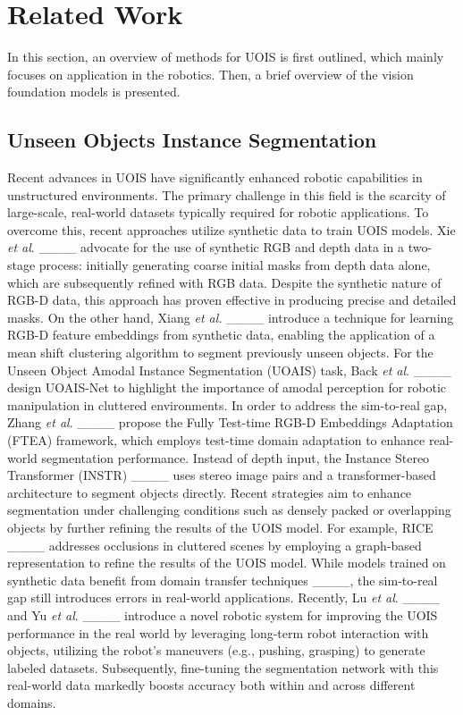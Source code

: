 \section{Related Work}
\label{section2}
In this section, an overview of methods for UOIS is first outlined, which mainly focuses on application in the robotics. Then, a brief overview of the vision foundation models is presented. 
\subsection{Unseen Objects Instance Segmentation}
Recent advances in UOIS have significantly enhanced robotic capabilities in unstructured environments. The primary challenge in this field is the scarcity of large-scale, real-world datasets typically required for robotic applications. To overcome this, recent approaches utilize synthetic data to train UOIS models. Xie \emph{et al}. ____ advocate for the use of synthetic RGB and depth data in a two-stage process: initially generating coarse initial masks from depth data alone, which are subsequently refined with RGB data. Despite the synthetic nature of RGB-D data, this approach has proven effective in producing precise and detailed masks. On the other hand, Xiang \emph{et al.} ____ introduce a technique for learning RGB-D feature embeddings from synthetic data, enabling the application of a mean shift clustering algorithm to segment previously unseen objects. For the Unseen Object Amodal Instance Segmentation (UOAIS) task, Back \emph{et al}. ____ design UOAIS-Net to highlight the importance of amodal perception for robotic manipulation in cluttered environments. In order to address the sim-to-real gap, Zhang \emph{et al}. ____ propose the Fully Test-time RGB-D Embeddings Adaptation (FTEA) framework, which employs test-time domain adaptation to enhance real-world segmentation performance. Instead of depth input, the Instance Stereo Transformer (INSTR) ____ uses stereo image pairs and a transformer-based architecture to segment objects directly. Recent strategies aim to enhance segmentation under challenging conditions such as densely packed or overlapping objects by further refining the results of the UOIS model. For example, RICE ____ addresses occlusions in cluttered scenes by employing a graph-based representation to refine the results of the UOIS model. While models trained on synthetic data benefit from domain transfer techniques ____, the sim-to-real gap still introduces errors in real-world applications. Recently, Lu \emph{et al}. ____ and Yu \emph{et al}. ____ introduce a novel robotic system for improving the UOIS performance in the real world by leveraging long-term robot interaction with objects, utilizing the robot's maneuvers (e.g., pushing, grasping) to generate labeled datasets. Subsequently, fine-tuning the segmentation network with this real-world data markedly boosts accuracy both within and across different domains.

